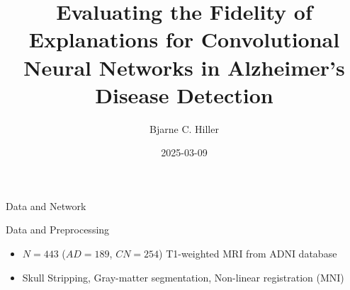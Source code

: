 \documentclass[aspectratio=169,xcolor={table, dvipsnames}]{beamer}
\title[Fidelity of Explanations for AD Classification from MRI]{Evaluating the Fidelity of Explanations for Convolutional Neural Networks in Alzheimer’s Disease Detection}
\author[Hiller]{Bjarne C. Hiller}
\date{2025-03-09}
\institute[Uni Rostock]{University of Rostock}
\begin{document}
\maketitle




\begin{frame}{Data and Network}
	\centering
	\begin{block}{Data and Preprocessing}
		\vfill
		\begin{itemize}
			\item $N=443$ ($AD = 189$, $CN=254$) T1-weighted MRI from ADNI database
			\item Skull Stripping, Gray-matter segmentation, Non-linear registration (MNI)
		\end{itemize}
	\end{block}
\end{frame}
\end{document}
